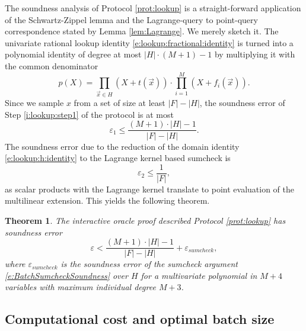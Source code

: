 \documentclass[11pt]{article}
\newtheorem{thm}{Theorem}[]
\theoremstyle{definition}
\theoremstyle{definition}
\newtheorem{rem}[thm]{Remark}
\begin{document}
The soundness analysis of Protocol \ref{prot:lookup} is a straight-forward application of the Schwartz-Zippel lemma and the Lagrange-query to point-query correspondence stated by Lemma \ref{lem:Lagrange}.
We merely sketch it.
The univariate rational lookup identity \eqref{e:lookup:fractional:identity} is turned into a polynomial identity of degree at most $|H|\cdot (M+1) - 1$ by multiplying it with the common denominator  
\begin{equation}
\label{e:lookup:common:denominator}
p(X) = \prod_{\vec x\in H} (X + t(\vec x)) \cdot \prod_{i=1}^M (X + f_i(\vec x)).
\end{equation}
Since we sample $x$ from a set of size at least $|F|-|H|$, the soundness error of Step \ref{i:lookup:step1} of the protocol is at most 
\begin{equation}
\label{e:lookup:epsilon1}
\varepsilon_1 \leq \frac{(M+1)\cdot |H| - 1 }{|F|-|H|}.
\end{equation}
The soundness error due to the reduction of the domain identity  \eqref{e:lookup:h:identity}  to the Lagrange kernel based sumcheck is 
\[
\varepsilon_2 \leq \frac{1}{|F|},
\]
as scalar products with the Lagrange kernel translate to point evaluation of the multilinear extension.
This yields the following theorem. 

\begin{thm}
\label{thm:lookup:soundness}
 The interactive oracle proof described Protocol \ref{prot:lookup} has soundness error
\[
\varepsilon < \frac{(M+1)\cdot |H| - 1 }{|F|-|H|} + \varepsilon_{sumcheck},
\]
where $\varepsilon_{sumcheck}$ is the soundness error of the sumcheck argument \eqref{e:BatchSumcheckSoundness} over $H$ for a multivariate polynomial in $M+4$ variables with maximum individual degree $M+3$.
\end{thm}


\subsection{Computational cost and optimal batch size}
\label{s:lookup:cost}
\end{document}
